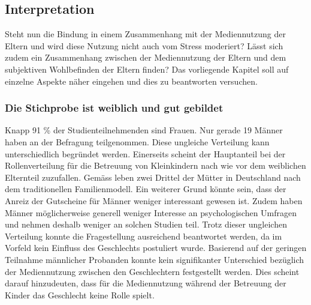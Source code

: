 \subsection{Interpretation} \label{sec:Interpretation}
Steht nun die Bindung in einem Zusammenhang mit der Mediennutzung der Eltern und wird diese Nutzung nicht auch vom Stress moderiert? Lässt sich zudem ein Zusammenhang zwischen der Mediennutzung der Eltern und dem subjektiven Wohlbefinden der Eltern finden? Das vorliegende Kapitel soll auf einzelne Aspekte näher eingehen und dies zu beantworten versuchen.

\subsubsection{Die Stichprobe ist weiblich und gut gebildet}
Knapp 91 \% der Studienteilnehmenden sind Frauen. Nur gerade 19 Männer haben an der Befragung teilgenommen. Diese ungleiche Verteilung kann unterschiedlich begründet werden. Einerseits scheint der Hauptanteil bei der Rollenverteilung für die Betreuung von Kleinkindern nach wie vor dem weiblichen Elternteil zuzufallen. Gemäss  leben zwei Drittel der Mütter in Deutschland nach dem traditionellen Familienmodell. Ein weiterer Grund könnte sein, dass der Anreiz der Gutscheine für Männer weniger interessant gewesen ist. Zudem haben Männer möglicherweise generell weniger Interesse an psychologischen Umfragen und nehmen deshalb weniger an solchen Studien teil. Trotz dieser ungleichen Verteilung konnte die Fragestellung ausreichend beantwortet werden, da im Vorfeld kein Einfluss des Geschlechts postuliert wurde. Basierend auf der geringen Teilnahme männlicher Probanden konnte kein signifikanter Unterschied bezüglich der Mediennutzung zwischen den Geschlechtern festgestellt werden. Dies scheint darauf hinzudeuten, dass für die Mediennutzung während der Betreuung der Kinder das Geschlecht keine Rolle spielt.

